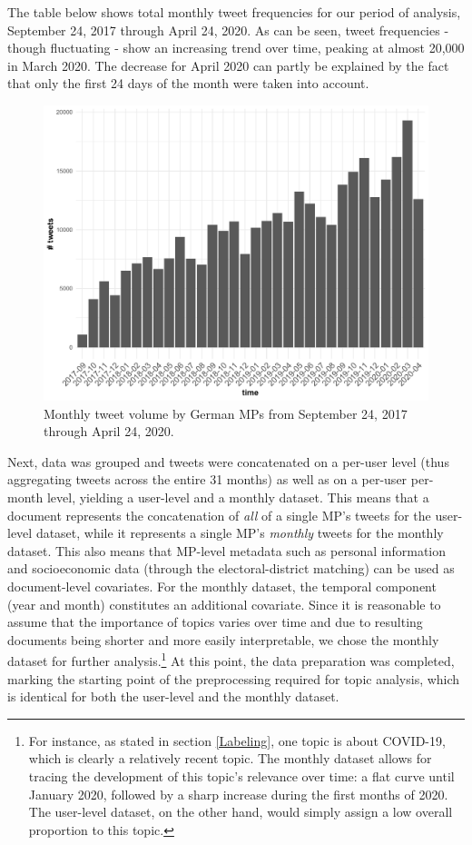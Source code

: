 The table below shows total monthly tweet frequencies for our period of analysis, September 24, 2017 through April 24, 2020. As can be seen, tweet frequencies - though fluctuating - show an increasing trend over time, peaking at almost 20,000 in March 2020. The decrease for April 2020 can partly be explained by the fact that only the first 24 days of the month were taken into account.

\begin{figure}[h!]
  \centering
  \captionsetup{justification=centering,margin=2cm}
  \includegraphics[scale = 0.5]{../plots/3/monthly_tweets.pdf}
  \caption{Monthly tweet volume by German MPs from September 24, 2017 through April 24, 2020.}
  \label{fig:monthly_tweets}
\end{figure}

Next, data was grouped and tweets were concatenated on a per-user level (thus aggregating tweets across the entire 31 months) as well as on a per-user per-month level, yielding a user-level and a monthly dataset. This means that a document represents the concatenation of \textit{all} of a single MP's tweets for the user-level dataset, while it represents a single MP's \textit{monthly} tweets for the monthly dataset. This also means that MP-level metadata such as personal information and socioeconomic data (through the electoral-district matching) can be used as document-level covariates. For the monthly dataset, the temporal component (year and month) constitutes an additional covariate. Since it is reasonable to assume that the importance of topics varies over time and due to resulting documents being shorter and more easily interpretable, we chose the monthly dataset for further analysis.\footnote{For instance, as stated in section \ref{Labeling}, one topic is about COVID-19, which is clearly a relatively recent topic. The monthly dataset allows for tracing the development of this topic's relevance over time: a flat curve until January 2020, followed by a sharp increase during the first months of 2020. The user-level dataset, on the other hand, would simply assign a low overall proportion to this topic.} At this point, the data preparation was completed, marking the starting point of the preprocessing required for topic analysis, which is identical for both the user-level and the monthly dataset.

